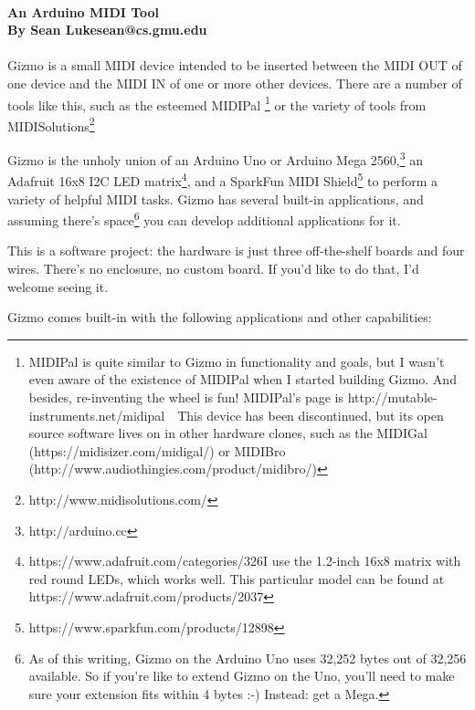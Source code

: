 \documentclass{article}
\begin{document}
\\
{\large \bf An Arduino MIDI Tool\\
By Sean Luke\quad sean@cs.gmu.edu}\\
\\

\noindent Gizmo is a small MIDI device intended to be inserted between the MIDI OUT of one device and the MIDI IN of one or more other devices.  There are a number of tools like this, such as the esteemed MIDIPal \footnote{MIDIPal is quite similar to Gizmo in functionality and goals, but I wasn't even aware of the existence of MIDIPal when I started building Gizmo.  And besides, re-inventing the wheel is fun!  MIDIPal's page is http:/\!/mutable-instruments.net/midipal\ \ This device has been discontinued, but its open source software lives on in other hardware clones, such as the MIDIGal (https:/\!/midisizer.com/midigal/) or MIDIBro (http:/\!/www.audiothingies.com/product/midibro/)} or the variety of tools from MIDISolutions\footnote{http:/\!/www.midisolutions.com/}

Gizmo is the unholy union of an Arduino Uno or Arduino Mega 2560,\footnote{http:/\!/arduino.cc} an Adafruit 16x8 I2C LED matrix\footnote{https:/\!/www.adafruit.com/categories/326\quad I use the 1.2-inch 16x8 matrix with red round LEDs, which works well.  This particular model can be found at https:/\!/www.adafruit.com/products/2037}, and a SparkFun MIDI Shield\footnote{https:/\!/www.sparkfun.com/products/12898} to perform a variety of helpful MIDI tasks.  Gizmo has several built-in applications, and assuming there's space\footnote{As of this writing, Gizmo on the Arduino Uno uses 32,252 bytes out of 32,256 available.  So if you're like to extend Gizmo on the Uno, you'll need to make sure your extension fits within 4 bytes :-)  Instead: get a Mega.} you can develop additional applications for it.

This is a software project: the hardware is just three off-the-shelf boards and four wires.  There's no enclosure, no custom board.  If you'd like to do that, I'd welcome seeing it.

Gizmo comes built-in with the following applications and other capabilities:
\end{document}
